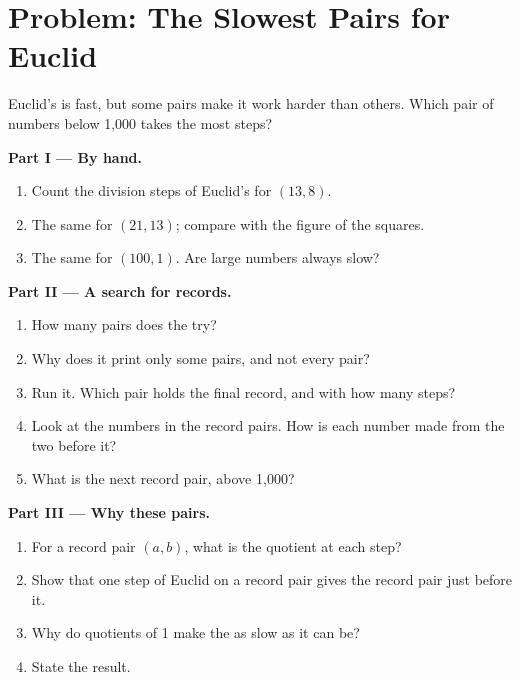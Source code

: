 \section{Problem: The Slowest Pairs for Euclid}

\begin{problem}\label{pb:g9:algorithms-on-numbers:1}
Euclid's  is fast, but some pairs make it work harder than others.
Which pair of numbers below 1,000 takes the most steps?

\medskip\noindent\textbf{Part I --- By hand.}
\begin{enumerate}
  \item Count the division steps of Euclid's  for $(13, 8)$.
  \item The same for $(21, 13)$; compare with the figure of the squares.
  \item The same for $(100, 1)$. Are large numbers always slow?
\end{enumerate}

\medskip\noindent\textbf{Part II --- A search for records.}

\label{lst:g9:algorithms-on-numbers:slowest}

\begin{enumerate}[resume]
  \item How many pairs does the  try?
  \item Why does it print only some pairs, and not every pair?
  \item Run it. Which pair holds the final record, and with how many steps?
  \item Look at the numbers in the record pairs. How is each number made from
    the two before it?
  \item What is the next record pair, above 1,000?
\end{enumerate}

\medskip\noindent\textbf{Part III --- Why these pairs.}
\begin{enumerate}[resume]
  \item For a record pair $(a, b)$, what is the quotient at each step?
  \item Show that one step of Euclid on a record pair gives the record pair just
    before it.
  \item Why do quotients of 1 make the  as slow as it can be?
  \item State the result.
\end{enumerate}
\end{problem}
